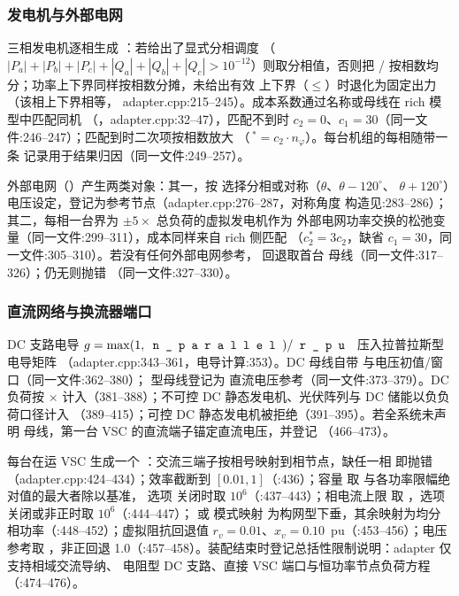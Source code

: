 \subsubsection*{发电机与外部电网}
三相发电机逐相生成 ：若给出了显式分相调度
（$|P_a|+|P_b|+|P_c|+|Q_a|+|Q_b|+|Q_c|>10^{-12}$）则取分相值，否则把
/ 按相数均分；功率上下界同样按相数分摊，未给出有效
上下界（$\le$）时退化为固定出力（该相上下界相等，
adapter.cpp:215--245）。成本系数通过名称或母线在 rich 模型中匹配同机
（，adapter.cpp:32--47），匹配不到时
$c_2=0$、$c_1=30$（同一文件:246--247）；匹配到时二次项按相数放大
（$\,{}^*=c_2\cdot n_\varphi$）。每台机组的每相随带一条
 记录用于结果归因（同一文件:249--257）。

外部电网（）产生两类对象：其一，按
 选择分相或对称（$\theta$、$\theta-120^\circ$、
$\theta+120^\circ$）电压设定，登记为参考节点（adapter.cpp:276--287，对称角度
构造见:283--286）；其二，每相一台界为 $\pm 5\times$ 总负荷的虚拟发电机作为
外部电网功率交换的松弛变量（同一文件:299--311），成本同样来自 rich 侧匹配
（$c_2^*=3c_2$，缺省 $c_1=30$，同一文件:305--310）。若没有任何外部电网参考，
回退取首台  母线（同一文件:317--326）；仍无则抛错
（同一文件:327--330）。

\subsubsection*{直流网络与换流器端口}
DC 支路电导 $g=\max(1,\fld{n\_parallel})/\fld{r\_pu}$ 压入拉普拉斯型电导矩阵
（adapter.cpp:343--361，电导计算:353）。DC 母线自带
 与电压初值/窗口（同一文件:362--380）； 型母线登记为
直流电压参考（同一文件:373--379）。DC 负荷按 $\times$
计入（381--388）；不可控 DC 静态发电机、光伏阵列与 DC 储能以负负荷口径计入
（389--415）；可控 DC 静态发电机被拒绝（391--395）。若全系统未声明
 母线，第一台 VSC 的直流端子锚定直流电压，并登记
（466--473）。

每台在运 VSC 生成一个 ：交流三端子按相号映射到相节点，缺任一相
即抛错（adapter.cpp:424--434）；效率截断到 $[0.01,1]$（:436）；容量
 取  与各功率限幅绝对值的最大者除以基准，
选项  关闭时取 $10^6$（:437--443）；相电流上限
取 ，选项  关闭或非正时取
$10^6$（:444--447）； 或  模式映射
为构网型下垂，其余映射为均分相功率（:448--452）；虚拟阻抗回退值
$r_v=0.01$、$x_v=0.10$~pu（:453--456）；电压参考取 ，非正回退
1.0（:457--458）。装配结束时登记总括性限制说明：adapter 仅支持相域交流导纳、
电阻型 DC 支路、直接 VSC 端口与恒功率节点负荷方程（:474--476）。

